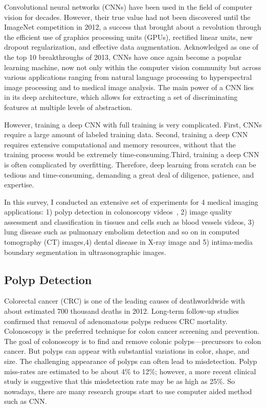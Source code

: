 \documentclass[10pt,twocolumn,letterpaper]{article}
\begin{document}
Convolutional neural networks (CNNs) have been used in the field of computer vision for decades. However, their true value had not been discovered until the ImageNet competition in 2012, a success that brought about a revolution through the efficient use of graphics processing units (GPUs), rectified linear units, new dropout regularization, and effective data augmentation. Acknowledged as one of the top 10 breakthroughs of 2013, CNNs have once again become a popular learning machine, now not only within the computer vision community but across various applications ranging from natural language processing to hyperspectral image processing and to medical image analysis. The main power of a CNN lies in its deep architecture, which allows for extracting a set of discriminating features at multiple levels of abstraction\cite{tajbakhsh2016convolutional}.

However, training a deep CNN with full training is very complicated. First, CNNs require a large
amount of labeled training data. Second, training a deep CNN requires extensive computational and memory resources, without that the training process would be extremely time-consuming.Third, training a deep CNN is often complicated by overfitting. Therefore, deep learning from scratch can be tedious and time-consuming, demanding a great deal of diligence, patience, and expertise.

In this survey, I conducted an extensive set of experiments for 4 medical imaging applications: 1) polyp detection in colonoscopy videos~\cite{ribeiro2016colonic}\cite{zhang2017automatic}, 2) image quality assessment and classification in tissues and cells such as blood vessels videos\cite{mcilroy2017vivo}\cite{li2017cell}\cite{huang2017epithelium}\cite{kieffer2017convolutional}\cite{hadad2017classification}\cite{araujo2017classification}, 3) lung disease such as pulmonary embolism detection and so on in computed tomography (CT) images\cite{shen2015multi}\cite{li2014medical},4) dental disease in X-ray image\cite{prajapaticlassification} and 5) intima-media boundary segmentation in ultrasonographic images\cite{roth2015anatomy}.

\subsection{Polyp Detection}

Colorectal cancer (CRC) is one of the leading causes of deathworldwide with about estimated 700 thousand deaths in 2012\cite{zhang2017automatic}. Long-term follow-up studies confirmed that removal of adenomatous polyps reduces CRC mortality. Colonoscopy is the preferred technique for colon cancer screening and prevention. The goal of colonoscopy is to find and remove colonic polyps—precursors to colon cancer. But polyps can appear with substantial variations in color, shape, and size. The challenging appearance of polyps can often lead to misdetection\cite{ribeiro2016colonic}. Polyp miss-rates are estimated to be about 4\% to 12\%; however, a more recent clinical study is suggestive that this misdetection rate may be as high as 25\%. So nowadays, there are many research groups start to use computer aided method such as CNN.
\end{document}
